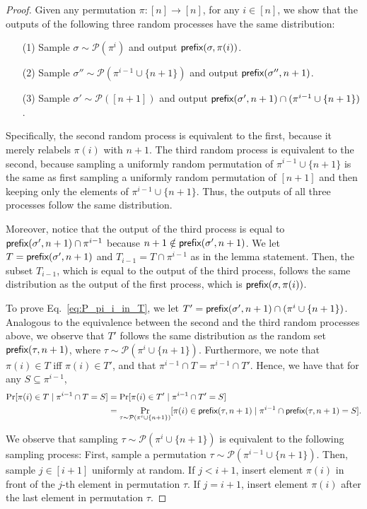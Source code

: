 \documentclass[11pt]{article}
\newcommand{\cP}{\mathcal P}
\newcommand{\pref}{\textnormal{\sffamily prefix}}
\begin{document}
\begin{proof}
Given any permutation $\pi:[n]\to[n]$, for any $i\in[n]$, we show that the outputs of the following three random processes have the same distribution:
\begin{enumerate}
    \item[(1)] Sample $\sigma\sim\cP(\pi^{i})$ and output $\pref(\sigma,\pi(i))$.
    \item[(2)] Sample $\sigma''\sim\cP(\pi^{i-1}\cup\{n+1\})$ and output $\pref(\sigma'',n+1)$.
    \item[(3)] Sample $\sigma'\sim\cP([n+1])$ and output $\pref(\sigma',n+1)\cap(\pi^{i-1}\cup\{n+1\})$.
\end{enumerate}
Specifically, the second random process is equivalent to the first, because it merely relabels $\pi(i)$ with $n+1$. The third random process is equivalent to the second, because sampling a uniformly random permutation of $\pi^{i-1}\cup\{n+1\}$ is the same as first sampling a uniformly random permutation of $[n+1]$ and then keeping only the elements of $\pi^{i-1}\cup\{n+1\}$. Thus, the outputs of all three processes follow the same distribution.

Moreover, notice that the output of the third process is equal to $\pref(\sigma',n+1)\cap\pi^{i-1}$ because $n+1\notin\pref(\sigma',n+1)$. We let $T=\pref(\sigma',n+1)$ and $T_{i-1}=T\cap\pi^{i-1}$ as in the lemma statement. Then, the subset $T_{i-1}$, which is equal to the output of the third process, follows the same distribution as the output of the first process, which is $\pref(\sigma,\pi(i))$.

To prove Eq.~\eqref{eq:P_pi_i_in_T}, we let $T'=\pref(\sigma',n+1)\cap(\pi^{i}\cup\{n+1\})$. Analogous to the equivalence between the second and the third random processes above, we observe that $T'$ follows the same distribution as the random set $\pref(\tau,n+1)$, where $\tau\sim\cP(\pi^{i}\cup\{n+1\})$. Furthermore, we note that $\pi(i)\in T$ iff $\pi(i)\in T'$, and that $\pi^{i-1}\cap T=\pi^{i-1}\cap T'$. Hence, we have that for any $S\subseteq\pi^{i-1}$,
\begin{align}\label{eq:insert_pi_i}
    \Pr[\pi(i)\in T\mid \pi^{i-1}\cap T=S]&=\Pr[\pi(i)\in T'\mid \pi^{i-1}\cap T'=S]\nonumber\\
    &=\Pr_{\tau\sim\cP(\pi^{i}\cup\{n+1\})}[\pi(i)\in\pref(\tau,n+1)\mid \pi^{i-1}\cap\pref(\tau,n+1)=S].
\end{align}

We observe that sampling $\tau\sim\cP(\pi^{i}\cup\{n+1\})$ is equivalent to the following sampling process: First, sample a permutation $\tau\sim\cP(\pi^{i-1}\cup\{n+1\})$. Then, sample $j\in [i+1]$ uniformly at random. If $j<i+1$, insert element $\pi(i)$ in front of the $j$-th element in permutation $\tau$. If $j=i+1$, insert element $\pi(i)$ after the last element in permutation $\tau$.


\end{proof}
\end{document}
